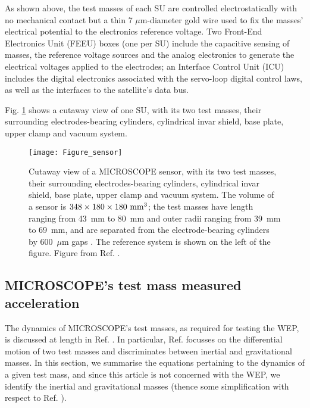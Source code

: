 \documentclass[12pt]{iopart}
\begin{document}
As shown above, the test masses of each SU are controlled electrostatically with no mechanical contact but a thin 7 $\mu$m-diameter gold wire used to fix the masses' electrical potential to the electronics reference voltage. Two Front-End Electronics Unit (FEEU) boxes (one per SU) include the capacitive sensing of masses, the reference voltage sources and the analog electronics to generate the electrical voltages applied to the electrodes; an Interface Control Unit (ICU) includes the digital electronics associated with the servo-loop digital control laws, as well as the interfaces to the satellite's data bus. %

Fig. \ref{fig_sensor} shows a cutaway view of one SU, with its two test masses, their surrounding electrodes-bearing cylinders, cylindrical invar shield, base plate, upper clamp and vacuum system.


\begin{figure}%
\begin{center}
\texttt{[image: Figure\_sensor]}
\caption{Cutaway view of a MICROSCOPE sensor, with its two test masses, their surrounding electrodes-bearing cylinders, cylindrical invar shield, base plate, upper clamp and vacuum system. The volume of a sensor is $348 \times 180 \times 180~{\rm mm}^3$; the test masses have length ranging from 43~mm to 80~mm and outer radii ranging from 39~mm to 69~mm, and are separated from the electrode-bearing cylinders by 600~$\mu$m gaps \cite{liorzou20}. The reference system is shown on the left of the figure. Figure from Ref. \cite{touboul19, liorzou20}.}
\label{fig_sensor}
\end{center}
\end{figure}



\subsection{MICROSCOPE's test mass measured acceleration}

The dynamics of MICROSCOPE's test masses, as required for testing the WEP, is discussed at length in Ref. \cite{touboul20}.
In particular, Ref. \cite{touboul20} focusses on the differential motion of two test masses and discriminates between inertial and gravitational masses. In this section, we summarise the equations pertaining to the dynamics of a given test mass, and since this article is not concerned with the WEP, we identify the inertial and gravitational masses (thence some simplification with respect to Ref. \cite{touboul20}).
\end{document}
